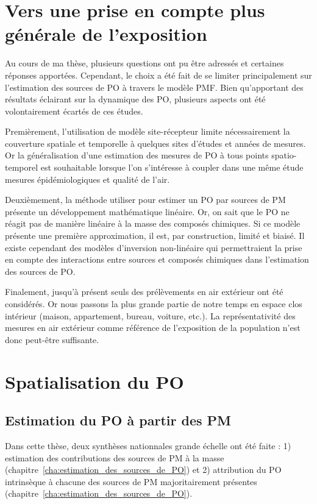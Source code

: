 
\section{Vers une prise en compte plus générale de l'exposition}

Au cours de ma thèse, plusieurs questions ont pu être adressés et certaines réponses apportées. 
Cependant, le choix a été fait de se limiter principalement sur l'estimation des 
sources de PO à travers le modèle PMF. Bien qu'apportant des résultats éclairant 
sur la dynamique des PO, plusieurs aspects ont été volontairement écartés de 
ces études.

Premièrement, l'utilisation de modèle site-récepteur limite nécessairement la
couverture spatiale et temporelle à quelques sites d'études et années de mesures. Or la généralisation d'une estimation des mesures de PO à tous points spatio-temporel est souhaitable lorsque l'on s'intéresse à coupler dans une même étude mesures épidémiologiques et qualité de l'air.

Deuxièmement, la méthode utiliser pour estimer un PO par sources de PM présente un développement mathématique linéaire. Or, on sait que le PO ne réagit pas de manière linéaire à la masse des composés chimiques. Si ce modèle présente une première approximation, il est, par construction, limité et biaisé.
Il existe cependant des modèles d'inversion non-linéaire qui permettraient la prise en compte des interactions entre sources et composés chimiques dans l'estimation des sources de PO.

Finalement, jusqu'à présent seuls des prélèvements en air extérieur ont été considérés. Or nous passons la plus grande partie de notre temps en espace clos intérieur (maison, appartement, bureau, voiture, etc.).
La représentativité des mesures en air extérieur comme référence de l'exposition de la population n'est donc peut-être suffisante.

\section{Spatialisation du PO}

\subsection{Estimation du PO à partir des PM}

Dans cette thèse, deux synthèses nationnales grande échelle ont été faite : 1) estimation des contributions des sources de PM à la masse \autocite{weberComparison2019} (chapitre~\ref{cha:estimation_des_sources_de_PO}) et 2) attribution du PO intrinsèque à chacune des sources de PM majoritairement présentes \autocite{weberSourceinprep.} (chapitre~\ref{cha:estimation_des_sources_de_PO}).

